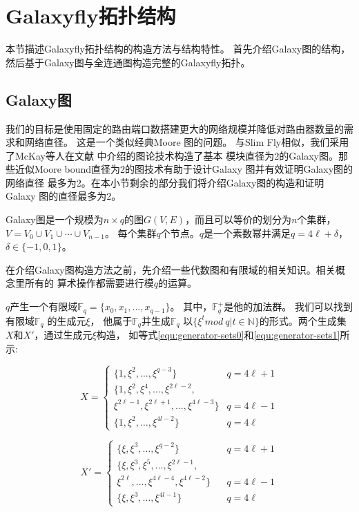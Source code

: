 \section{Galaxyfly拓扑结构}

本节描述Galaxyfly拓扑结构的构造方法与结构特性。
首先介绍Galaxy图的结构，然后基于Galaxy图与全连通图构造完整的Galaxyfly拓扑。

\subsection{Galaxy图}

我们的目标是使用固定的路由端口数搭建更大的网络规模并降低对路由器数量的需求和网络直径。
这是一个类似经典Moore 图的问题。
与Slim Fly相似，我们采用了McKay等人在文献 中介绍的图论技术构造了基本
模块直径为2的Galaxy图。那些近似Moore bound直径为2的图技术有助于设计Galaxy 图并有效证明Galaxy图的网络直径
最多为2。在本小节剩余的部分我们将介绍Galaxy图的构造和证明Galaxy 图的直径最多为2。

Galaxy图是一个规模为$n\times q$的图$G(V,E)$，而且可以等价的划分为$n$个集群，$V= V_{0}\cup V_{1}\cup \cdots \cup V_{n-1}$。
每个集群$q$个节点。$q$是一个素数幂并满足$q=4\ell+\delta$， $\delta\in\{-1,0,1\}$。

在介绍Galaxy图构造方法之前，先介绍一些代数图和有限域的相关知识。相关概念里所有的
算术操作都需要进行模$q$的运算。

$q$产生一个有限域$\mathds{F}_q=\{x_{0},x_{1},...,x_{q-1}\}$。 其中，$\mathds{F}_q^+$是他的加法群。
我们可以找到有限域$\mathds{F}_q$
的生成元$\xi$， 他属于$\mathds{F}_q$并生成$\mathds{F}_q$
以$\{\xi^t mod\ q | t \in \mathds{N}\}$的形式。两个生成集$X$和$X'$，通过生成元$\xi$构造，
如等式\eqref{equ:generator-sets0}和\eqref{equ:generator-sets1}所示:

\begin{equation}\label{equ:generator-sets0}
  X=
  \begin{cases}
    \{1,\xi^2,\ldots,\xi^{q-3}\}& q=4 \ell+1 \\
    \{1,\xi^2,\xi^4,\ldots, \xi^{2\ell-2},\\\xi^{2\ell-1},\xi^{2\ell+1},\ldots, \xi^{4\ell-3}\} & q=4 \ell-1 \\
    \{1,\xi^2,\ldots,\xi^{4l-2}\} & q=4 \ell
  \end{cases}
\end{equation}

\begin{equation}\label{equ:generator-sets1}
  X'=
  \begin{cases}
    \{\xi,\xi^3,\ldots,\xi^{q-2}\} & q=4 \ell+1 \\
    \{\xi,\xi^3,\xi^5,\ldots,\xi^{2\ell-1}, \\\xi^{2\ell},\ldots,\xi^{4\ell-4},\xi^{4\ell-2}\}\ \ \ \  & q=4 \ell-1 \\
    \{\xi,\xi^3,\ldots,\xi^{4l-1}\} & q=4 \ell
  \end{cases}
\end{equation}

